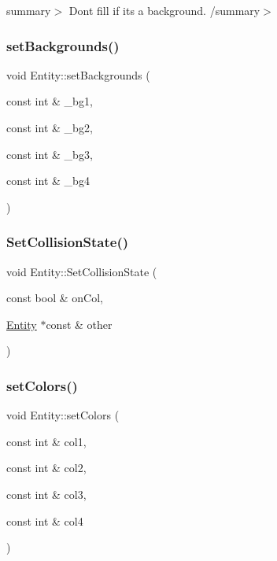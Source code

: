 summary$>$ Don\textquotesingle{}t fill if it\textquotesingle{}s a background. /summary$>$ \mbox{\label{class_entity_a14cd8bed97e3242cac6d931ebb1d1df0}} 
\subsubsection{\texorpdfstring{set\+Backgrounds()}{setBackgrounds()}}
{\footnotesize\ttfamily void Entity\+::set\+Backgrounds (\begin{DoxyParamCaption}\item[{const int \&}]{\+\_\+bg1,  }\item[{const int \&}]{\+\_\+bg2,  }\item[{const int \&}]{\+\_\+bg3,  }\item[{const int \&}]{\+\_\+bg4 }\end{DoxyParamCaption})}

\mbox{\label{class_entity_ac440ee8ac6f48c24176229ad9d36c2a7}} 
\subsubsection{\texorpdfstring{Set\+Collision\+State()}{SetCollisionState()}}
{\footnotesize\ttfamily void Entity\+::\+Set\+Collision\+State (\begin{DoxyParamCaption}\item[{const bool \&}]{on\+Col,  }\item[{\hyperlink{class_entity}{Entity} $\ast$const \&}]{other }\end{DoxyParamCaption})\hspace{0.3cm}{\ttfamily [inline]}}

\mbox{\label{class_entity_ae310776d8da6fc5444649b286361ae6a}} 
\subsubsection{\texorpdfstring{set\+Colors()}{setColors()}}
{\footnotesize\ttfamily void Entity\+::set\+Colors (\begin{DoxyParamCaption}\item[{const int \&}]{col1,  }\item[{const int \&}]{col2,  }\item[{const int \&}]{col3,  }\item[{const int \&}]{col4 }\end{DoxyParamCaption})}

